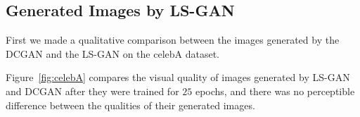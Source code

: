\subsection{Generated Images by LS-GAN}

First we made a qualitative comparison between the images generated by the DCGAN and the LS-GAN on the celebA dataset.

Figure~\ref{fig:celebA} compares the visual quality of images generated by LS-GAN and DCGAN after they were trained for $25$ epochs, and
there was no perceptible difference between the qualities of their generated images.

\begin{figure}[t!]
\centering
{}%
\end{figure}
